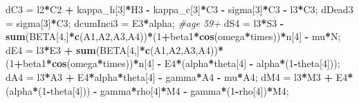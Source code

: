 \documentclass[
]{article}
\newenvironment{Shaded}{\begin{snugshade}}{\end{snugshade}}
\newcommand{\CommentTok}[1]{\textcolor[rgb]{0.56,0.35,0.01}{\textit{#1}}}
\newcommand{\DecValTok}[1]{\textcolor[rgb]{0.00,0.00,0.81}{#1}}
\newcommand{\KeywordTok}[1]{\textcolor[rgb]{0.13,0.29,0.53}{\textbf{#1}}}
\newcommand{\NormalTok}[1]{#1}
\newcommand{\OperatorTok}[1]{\textcolor[rgb]{0.81,0.36,0.00}{\textbf{#1}}}
\newcommand{\StringTok}[1]{\textcolor[rgb]{0.31,0.60,0.02}{#1}}
\begin{document}
\begin{Shaded}
\begin{Highlighting}[]
\NormalTok{    dC3 =}\StringTok{ }\NormalTok{l2}\OperatorTok{*}\NormalTok{C2 }\OperatorTok{+}\StringTok{ }\NormalTok{kappa_h[}\DecValTok{3}\NormalTok{]}\OperatorTok{*}\NormalTok{H3 }\OperatorTok{-}\StringTok{ }\NormalTok{kappa_c[}\DecValTok{3}\NormalTok{]}\OperatorTok{*}\NormalTok{C3 }\OperatorTok{-}\StringTok{ }\NormalTok{sigma[}\DecValTok{3}\NormalTok{]}\OperatorTok{*}\NormalTok{C3 }\OperatorTok{-}\StringTok{ }\NormalTok{l3}\OperatorTok{*}\NormalTok{C3;}
\NormalTok{    dDead3 =}\StringTok{ }\NormalTok{sigma[}\DecValTok{3}\NormalTok{]}\OperatorTok{*}\NormalTok{C3;}
\NormalTok{    dcumInci3 =}\StringTok{ }\NormalTok{E3}\OperatorTok{*}\NormalTok{alpha;}
  \CommentTok{#age 59+}
\NormalTok{    dS4 =}\StringTok{ }\NormalTok{l3}\OperatorTok{*}\NormalTok{S3 }\OperatorTok{-}\StringTok{ }\KeywordTok{sum}\NormalTok{(BETA[}\DecValTok{4}\NormalTok{,]}\OperatorTok{*}\KeywordTok{c}\NormalTok{(A1,A2,A3,A4))}\OperatorTok{*}\NormalTok{(}\DecValTok{1}\OperatorTok{+}\NormalTok{beta1}\OperatorTok{*}\KeywordTok{cos}\NormalTok{(omega}\OperatorTok{*}\NormalTok{times))}\OperatorTok{*}\NormalTok{n[}\DecValTok{4}\NormalTok{] }\OperatorTok{-}\StringTok{ }\NormalTok{mu}\OperatorTok{*}\NormalTok{N;}
\NormalTok{    dE4 =}\StringTok{ }\NormalTok{l3}\OperatorTok{*}\NormalTok{E3 }\OperatorTok{+}\StringTok{ }\KeywordTok{sum}\NormalTok{(BETA[}\DecValTok{4}\NormalTok{,]}\OperatorTok{*}\KeywordTok{c}\NormalTok{(A1,A2,A3,A4))}\OperatorTok{*}\NormalTok{(}\DecValTok{1}\OperatorTok{+}\NormalTok{beta1}\OperatorTok{*}\KeywordTok{cos}\NormalTok{(omega}\OperatorTok{*}\NormalTok{times))}\OperatorTok{*}\NormalTok{n[}\DecValTok{4}\NormalTok{] }\OperatorTok{-}\StringTok{ }\NormalTok{E4}\OperatorTok{*}\NormalTok{(alpha}\OperatorTok{*}\NormalTok{theta[}\DecValTok{4}\NormalTok{] }\OperatorTok{-}\StringTok{ }\NormalTok{alpha}\OperatorTok{*}\NormalTok{(}\DecValTok{1}\OperatorTok{-}\NormalTok{theta[}\DecValTok{4}\NormalTok{]));}
\NormalTok{    dA4 =}\StringTok{ }\NormalTok{l3}\OperatorTok{*}\NormalTok{A3 }\OperatorTok{+}\StringTok{ }\NormalTok{E4}\OperatorTok{*}\NormalTok{alpha}\OperatorTok{*}\NormalTok{theta[}\DecValTok{4}\NormalTok{] }\OperatorTok{-}\StringTok{ }\NormalTok{gamma}\OperatorTok{*}\NormalTok{A4 }\OperatorTok{-}\StringTok{ }\NormalTok{mu}\OperatorTok{*}\NormalTok{A4;}
\NormalTok{    dM4 =}\StringTok{ }\NormalTok{l3}\OperatorTok{*}\NormalTok{M3 }\OperatorTok{+}\StringTok{ }\NormalTok{E4}\OperatorTok{*}\NormalTok{(alpha}\OperatorTok{*}\NormalTok{(}\DecValTok{1}\OperatorTok{-}\NormalTok{theta[}\DecValTok{4}\NormalTok{])) }\OperatorTok{-}\StringTok{ }\NormalTok{gamma}\OperatorTok{*}\NormalTok{rho[}\DecValTok{4}\NormalTok{]}\OperatorTok{*}\NormalTok{M4 }\OperatorTok{-}\StringTok{ }\NormalTok{gamma}\OperatorTok{*}\NormalTok{(}\DecValTok{1}\OperatorTok{-}\NormalTok{rho[}\DecValTok{4}\NormalTok{])}\OperatorTok{*}\NormalTok{M4;}

\end{Highlighting}
\end{Shaded}
\end{document}
